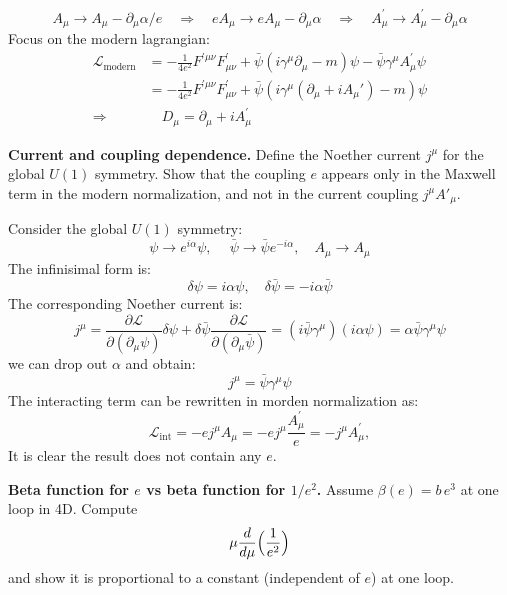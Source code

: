 \begin{solution}[22.2]
	\[
		A_{\mu}\rightarrow A_{\mu}-\partial_{\mu}\alpha/e
		\quad\Rightarrow\quad
		eA_{\mu}\to eA_{\mu}-\partial_{\mu}\alpha
		\quad\Rightarrow\quad
		A_{\mu}^{\prime}\to A_{\mu}^{\prime}-\partial_{\mu}\alpha
	\]
	Focus on the modern lagrangian:
	\[
	\begin{aligned}
			\mathcal{L}_{\mathrm{modern}}&=-\frac{1}{4e^2}F^{\prime\mu\nu}F_{\mu\nu}^{\prime}+\bar{\psi}(i\gamma^\mu\partial_\mu-m)\psi-\bar{\psi}\gamma^\mu A_\mu^{\prime}\psi\\
		&=-\frac{1}{4e^2}F^{\prime\mu\nu}F_{\mu\nu}^{\prime}+\bar{\psi}\left(i\gamma^\mu\left(\partial_\mu+i{A_\mu}'\right)-m\right)\psi\\
		\Rightarrow&\quad D_{\mu}=\partial_{\mu}+iA_{\mu}^{\prime}
	\end{aligned}
	\]
\end{solution}
\begin{problem}
    \textbf{Current and coupling dependence.} Define the Noether current \(j^\mu\) for the global \(U(1)\) symmetry. Show that the coupling \(e\) appears only in the Maxwell term in the modern normalization, and not in the current coupling \(j^\mu A'_\mu\).
\end{problem}
\begin{solution}[22.3]
	Consider the global $U(1)$ symmetry:
	\[
	\psi\to e^{i\alpha}\psi,\quad\mathrm{~}\bar{\psi}\to\bar{\psi}e^{-i\alpha},\quad A_{\mu}\to A_{\mu}
	\]
	The infinisimal form is:
	\[
	\delta\psi=i\alpha\psi,\quad\delta\bar{\psi}=-i\alpha\bar{\psi}
	\]
	The corresponding Noether current is:
	\[
	j^\mu=\frac{\partial\mathcal{L}}{\partial(\partial_\mu\psi)}\delta\psi+\delta\bar{\psi}\frac{\partial\mathcal{L}}{\partial(\partial_\mu\bar{\psi})}=(i\bar{\psi}\gamma^\mu)(i\alpha\psi)=\alpha\bar{\psi}\gamma^\mu\psi
	\]
	we can drop out $\alpha$ and obtain:
	\[
	\boxed{j^{\mu}=	\bar{\psi}\gamma^\mu\psi}
	\]
	The interacting term can be rewritten in morden normalization as:
	\[
	\mathcal{L}_{\text{int}}=-ej^\mu A_\mu=-ej^\mu\frac{A_\mu^{\prime}}{e}=\boxed{-j^\mu A_\mu^{\prime}},
	\]
	It is clear the result does not contain any $e$.
\end{solution}
\begin{problem}
    \textbf{Beta function for \(e\) vs beta function for \(1/e^2\).} Assume \(\beta(e)=b\,e^3\) at one loop in 4D. Compute
    \[
        \mu\frac{d}{d\mu}\Bigl(\frac{1}{e^{2}}\Bigr)
    \]
    and show it is proportional to a constant (independent of \(e\)) at one loop.
\end{problem}
